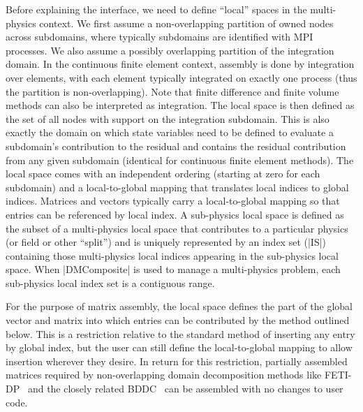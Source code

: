 Before explaining the interface, we need to define ``local'' spaces in the multi-physics context.
We first assume a non-overlapping partition of owned nodes across subdomains, where typically subdomains are identified with MPI processes.
We also assume a possibly overlapping partition of the integration domain.
In the continuous finite element context, assembly is done by integration over elements, with each element typically integrated on exactly one process (thus the partition is non-overlapping).
Note that finite difference and finite volume methods can also be interpreted as integration.
The local space is then defined as the set of all nodes with support on the integration subdomain.
This is also exactly the domain on which state variables need to be defined to evaluate a subdomain's contribution to the residual and contains the residual contribution from any given subdomain (identical for continuous finite element methods).
The local space comes with an independent ordering (starting at zero for each subdomain) and a local-to-global mapping that translates local indices to global indices.
Matrices and vectors typically carry a local-to-global mapping so that entries can be referenced by local index.
A sub-physics local space is defined as the subset of a multi-physics local space that contributes to a particular physics (or field or other ``split'') and is uniquely represented by an index set (\cverb|IS|) containing those multi-physics local indices appearing in the sub-physics local space.
When \cverb|DMComposite| is used to manage a multi-physics problem, each sub-physics local index set is a contiguous range.

For the purpose of matrix assembly, the local space defines the part of the global vector and matrix into which entries can be contributed by the method outlined below.
This is a restriction relative to the standard method of inserting any entry by global index, but the user can still define the local-to-global mapping to allow insertion wherever they desire.
In return for this restriction, partially assembled matrices required by non-overlapping domain decomposition methods like FETI-DP~\cite{farhat2001feti,farhat2000scalable,klawonn2006dual,klawonn2007robust,klawonn2007inexact} and the closely related BDDC~\cite{dohrmann2003psb,mandel2003cbd,li2006bddc} can be assembled with no changes to user code.

